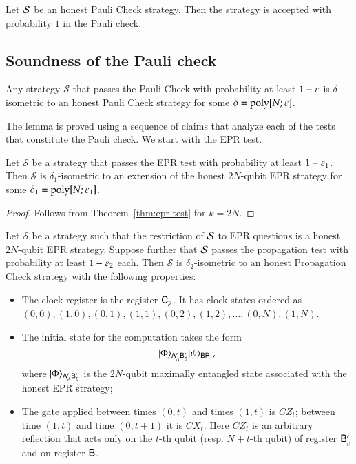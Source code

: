 \begin{lemma}\label{lem:paulicheck-compleness}
Let $\mathcal{S}$ be an honest Pauli Check strategy. Then the strategy is accepted with probability $1$ in the Pauli check.
\end{lemma}


\subsection{Soundness of the Pauli check}

\begin{lemma}\label{lem:paulicheck-soundness}
Any strategy $\mathcal{S}$ that passes the Pauli Check with probability at least $1 - \varepsilon$ is $\delta$-isometric to an honest Pauli Check strategy for some $\delta = \operatorname{poly}[N;\varepsilon]$.
\end{lemma}

The lemma is proved using a sequence of claims that analyze each of the tests that constitute the Pauli check. We start with the EPR test. 

\begin{claim}
Let $\mathcal{S}$ be a strategy that passes the EPR test with probability at least $1 - \varepsilon_1$. Then $\mathcal{S}$ is $\delta_1$-isometric to an extension of the honest $2N$-qubit EPR strategy for some $\delta_1 = \operatorname{poly}[N;\varepsilon_1]$.
\end{claim}

\begin{proof}
Follows from Theorem~\ref{thm:epr-test} for $k=2N$. 
\end{proof}

\begin{claim}\label{claim:pauli-propagation}
Let $\mathcal{S}$ be a strategy such that the restriction of $\mathcal{S}$ to EPR questions is a honest $2N$-qubit EPR strategy. Suppose further that $\mathcal{S}$ passes the propagation test with probability at least $1-\varepsilon_2$ each. Then $\mathcal{S}$ is $\delta_2$-isometric to an honest Propagation Check strategy with the following properties:
\begin{itemize}
\item The clock register is the register ${\mathsf{C}}_p$. It has clock states ordered as $(0,0),(1,0),(0,1),(1,1),(0,2),(1,2),\ldots,(0,N),(1,N)$. 
\item The initial state for the computation takes the form 
\begin{equation}\label{eq:pauli-prop-1}
\ket{\Phi}_{\sA'_A\sB'_B} \ket{\psi}_{\sB\sR}\;,
\end{equation}
where $|\Phi\rangle_{{\mathsf{A}}'_A{\mathsf{B}}'_B}$ is the $2N$-qubit maximally entangled state associated with the honest EPR strategy;
\item The gate applied between times $(0,t)$ and times $(1,t)$ is $CZ_t$; between time $(1,t)$ and time $(0,t+1)$ it is $CX_t$. Here $CZ_t$ is an arbitrary reflection that acts only on the $t$-th qubit (resp. $N+t$-th qubit) of register ${\mathsf{B}}'_B$ and on register ${\mathsf{B}}$. 
\end{itemize}
\end{claim}

